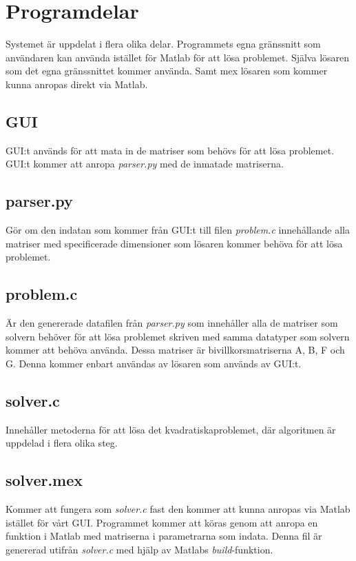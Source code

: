 \section{Programdelar}
Systemet är uppdelat i flera olika delar. Programmets egna gränssnitt som användaren kan använda istället för Matlab för att lösa problemet. Själva lösaren som det egna gränssnittet kommer använda. Samt mex lösaren som kommer kunna anropas direkt via Matlab.

\subsection{GUI}
GUI:t används för att mata in de matriser som behövs för att lösa problemet. GUI:t kommer att anropa \textit{parser.py} med de inmatade matriserna.

\subsection{parser.py}
Gör om den indatan som kommer från GUI:t till filen \textit{problem.c} innehållande alla matriser med specificerade dimensioner som lösaren kommer behöva för att lösa problemet.

\subsection{problem.c}
Är den genererade datafilen från \textit{parser.py} som innehåller alla de matriser som solvern behöver för att lösa problemet skriven med samma datatyper som solvern kommer att behöva använda. Dessa matriser är bivillkorsmatriserna A, B, F och G. Denna kommer enbart användas av lösaren som används av GUI:t.

\subsection{solver.c}
Innehåller metoderna för att lösa det kvadratiskaproblemet, där algoritmen är uppdelad i flera olika steg.

\subsection{solver.mex}
Kommer att fungera som \textit{solver.c} fast den kommer att kunna anropas via Matlab istället för vårt GUI. Programmet kommer att köras genom att anropa en funktion i Matlab med matriserna i parametrarna som indata. Denna fil är genererad utifrån \textit{solver.c} med hjälp av Matlabs \textit{build}-funktion.